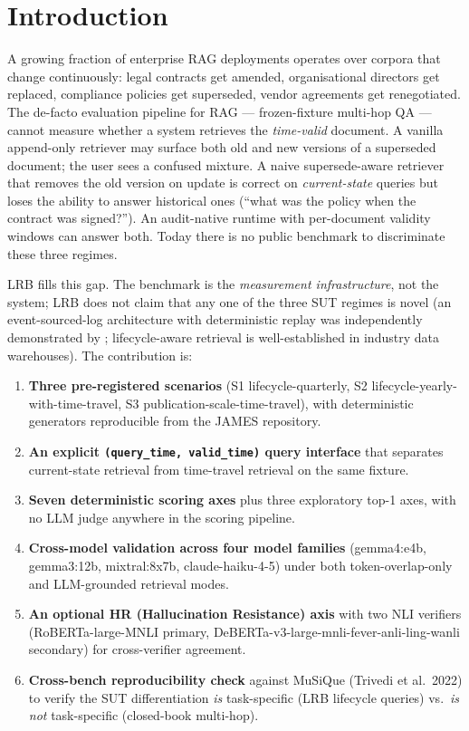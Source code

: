 \documentclass[11pt,a4paper]{article}
\begin{document}
\section{Introduction}
\label{sec:intro}

A growing fraction of enterprise RAG deployments operates over corpora that change continuously: legal contracts get amended, organisational directors get replaced, compliance policies get superseded, vendor agreements get renegotiated. The de-facto evaluation pipeline for RAG --- frozen-fixture multi-hop QA --- cannot measure whether a system retrieves the \emph{time-valid} document. A vanilla append-only retriever may surface both old and new versions of a superseded document; the user sees a confused mixture. A naive supersede-aware retriever that removes the old version on update is correct on \emph{current-state} queries but loses the ability to answer historical ones (``what was the policy when the contract was signed?''). An audit-native runtime with per-document validity windows can answer both. Today there is no public benchmark to discriminate these three regimes.

LRB fills this gap. The benchmark is the \emph{measurement infrastructure}, not the system; LRB does not claim that any one of the three SUT regimes is novel (an event-sourced-log architecture with deterministic replay was independently demonstrated by \cite{nakajima2026activegraph}; lifecycle-aware retrieval is well-established in industry data warehouses). The contribution is:

\begin{enumerate}[leftmargin=*]
  \item \textbf{Three pre-registered scenarios} (S1 lifecycle-quarterly, S2 lifecycle-yearly-with-time-travel, S3 publication-scale-time-travel), with deterministic generators reproducible from the JAMES repository.
  \item \textbf{An explicit \texttt{(query\_time, valid\_time)} query interface} that separates current-state retrieval from time-travel retrieval on the same fixture.
  \item \textbf{Seven deterministic scoring axes} plus three exploratory top-1 axes, with no LLM judge anywhere in the scoring pipeline.
  \item \textbf{Cross-model validation across four model families} (gemma4:e4b, gemma3:12b, mixtral:8x7b, claude-haiku-4-5) under both token-overlap-only and LLM-grounded retrieval modes.
  \item \textbf{An optional HR (Hallucination Resistance) axis} with two NLI verifiers (RoBERTa-large-MNLI primary, DeBERTa-v3-large-mnli-fever-anli-ling-wanli secondary) for cross-verifier agreement.
  \item \textbf{Cross-bench reproducibility check} against MuSiQue (Trivedi et al.~2022) to verify the SUT differentiation \emph{is} task-specific (LRB lifecycle queries) vs.~\emph{is not} task-specific (closed-book multi-hop).
\end{enumerate}
\end{document}
